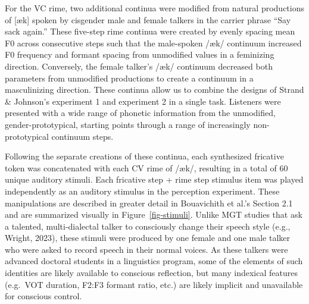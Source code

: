 \documentclass[
  letterpaper,
  DIV=11,
  numbers=noendperiod]{scrartcl}
\begin{document}
For the VC rime, two additional continua were modified from natural
productions of {[}æk{]} spoken by cisgender male and female talkers in
the carrier phrase ``Say sack again.'' These five-step rime continua
were created by evenly spacing mean F0 across consecutive steps such
that the male-spoken /æk/ continuum increased F0 frequency and formant
spacing from unmodified values in a feminizing direction. Conversely,
the female talker's /æk/ continuum decreased both parameters from
unmodified productions to create a continuum in a masculinizing
direction. These continua allow us to combine the designs of Strand \&
Johnson's experiment 1 and experiment 2 in a single task. Listeners were
presented with a wide range of phonetic information from the unmodified,
gender-prototypical, starting points through a range of increasingly
non-prototypical continuum steps.

Following the separate creations of these continua, each synthesized
fricative token was concatenated with each CV rime of /æk/, resulting in
a total of 60 unique auditory stimuli. Each fricative step + rime step
stimulus item was played independently as an auditory stimulus in the
perception experiment. These manipulations are described in greater
detail in Bouavichith et al.'s Section 2.1 and are summarized visually
in Figure~\ref{fig-stimuli}. Unlike MGT studies that ask a talented,
multi-dialectal talker to consciously change their speech style (e.g.,
Wright, 2023), these stimuli were produced by one female and one male
talker who were asked to record speech in their normal voices. As these
talkers were advanced doctoral students in a linguistics program, some
of the elements of such identities are likely available to conscious
reflection, but many indexical features (e.g.~VOT duration, F2:F3
formant ratio, etc.) are likely implicit and unavailable for conscious
control.
\end{document}
